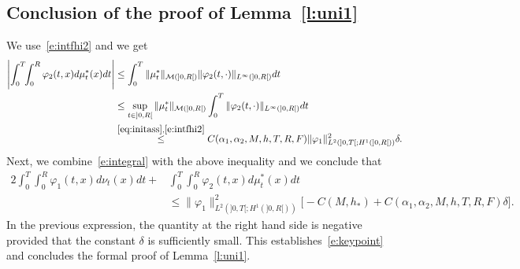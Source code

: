 \documentclass[11pt,leqno]{amsart}
\numberwithin{equation}{section}
\begin{document}
\subsection{Conclusion of the proof of Lemma~\ref{l:uni1}}
\label{ss:tuttorigoroso}
We use~\eqref{e:intfhi2} and we get 
\begin{equation}
\begin{split}
   \left| \int_0^T \! \! \int_0^R 
   {\varphi}_2 (t, x) d \mu_t^* (x) dt \right|
  &  \leq \int_0^T
   \| \mu_t^* \|_{\mathcal M (]0, R[)} 
   \| {\varphi}_2 (t, \cdot) \|_{L^\infty (]0, R[)}dt  \\
   & \leq \sup_{t \in ]0, R[} 
   \| \mu_t^* \|_{\mathcal M (]0, R[)}  
   \int_0^T 
   \| {\varphi}_2 (t, \cdot) \|_{L^\infty (]0, R[)}dt  \\
   & \stackrel{\eqref{eq:initass},\eqref{e:intfhi2}}{\leq}
   C (\alpha_1, \alpha_2, M, h, T, R, F)
   \| {\varphi}_1 \|^2_{L^2(]0, T[ ; H^1(]0, R[ ))}
   \delta . 
   \end{split}
\end{equation}
Next, we combine~\eqref{e:integral} with the above inequality and we conclude that 
\begin{equation}
\label{e:stimafinale}
\begin{split}
   2\int_0^T  \! \! \! \int_0^R {\varphi}_1(t,x) d\nu_t(x)dt +& 
   \int_0^T \! \! \! \int_0^R 
   {\varphi}_2 (t, x) d \mu^\ast_t (x) dt \\ & 
\leq  \| {\varphi}_1 \|^2_{L^2 (  ]0, T[; H^1 (]0, R[))} 
\Big[ 
- C(M, h_\ast) +  C(\alpha_1, \alpha_2, M, h, T, R, F)  \delta
\Big].
\end{split}
\end{equation}
In the previous expression, the quantity at the right hand side is negative provided  
that the constant $\delta$ is sufficiently small. This establishes~\eqref{e:keypoint} and concludes the formal proof of Lemma~\ref{l:uni1}. 
\end{document}
